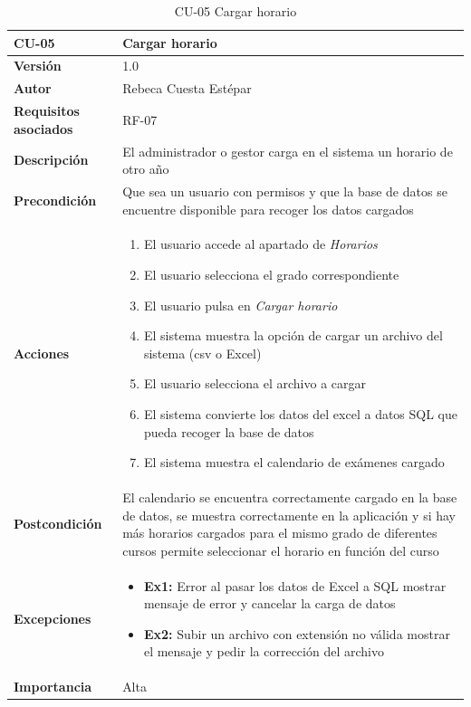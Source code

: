 \begin{table}[p]
	\centering
	\begin{tabularx}{\linewidth}{ p{} p{} }
		\toprule
		\textbf{CU-05}    & \textbf{Cargar horario}\\
		\toprule
		\textbf{Versión}              & 1.0    \\
		\textbf{Autor}                & Rebeca Cuesta Estépar \\
		\textbf{Requisitos asociados} & RF-07 \\
		\textbf{Descripción}          & El administrador o gestor carga en el sistema un horario de otro año\\
		\textbf{Precondición}         & Que sea un usuario con permisos y que la base de datos se encuentre disponible para recoger los datos cargados \\
		\textbf{Acciones}             &
		\begin{enumerate}
			\def\labelenumi{\arabic{enumi}.}
			\tightlist
			\item El usuario accede al apartado de \emph{Horarios}
			\item El usuario selecciona el grado correspondiente
			\item El usuario pulsa en \emph{Cargar horario}
			\item El sistema muestra la opción de cargar un archivo del sistema (csv o Excel) 
			\item El usuario selecciona el archivo a cargar
			\item El sistema convierte los datos del excel a datos SQL que pueda recoger la base de datos
			\item El sistema muestra el calendario de exámenes cargado
		\end{enumerate}\\
		\textbf{Postcondición} &   El calendario se encuentra correctamente cargado en la base de datos, se muestra correctamente en la aplicación y si hay más horarios cargados para el mismo grado de diferentes cursos permite seleccionar el horario en función del curso \\
		\textbf{Excepciones}          & 
		\begin{itemize}
			\tightlist
			\item \textbf{Ex1:} Error al pasar los datos de Excel a SQL \textrightarrow{} mostrar mensaje de error y cancelar la carga de datos
			\item \textbf{Ex2:} Subir un archivo con extensión no válida \textrightarrow{} mostrar el mensaje y pedir la corrección del archivo
		\end{itemize} \\
		\textbf{Importancia}          & Alta \\
		\bottomrule
	\end{tabularx}
	\caption{CU-05 Cargar horario}
\end{table}


